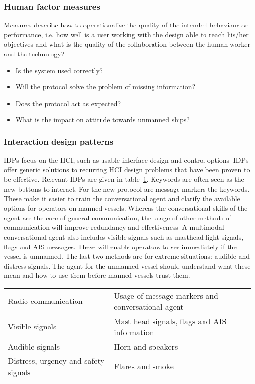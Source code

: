 \subsubsection{Human factor measures}
Measures describe how to operationalise the quality of the intended behaviour or performance, i.e. how well is a user working with the design able to reach his/her objectives and what is the quality of the collaboration between the human worker and the technology?
\begin{multicols}{2}
\begin{itemize}
	\item Is the system used correctly?
	\item Will the protocol solve the problem of missing information?
	\item Does the protocol act as expected?
	\item What is the impact on attitude towards unmanned ships?
\end{itemize}
\end{multicols}

\subsubsection{Interaction design patterns}
\acf{IDPs} focus on the \acf{HCI}, such as usable interface design and control options. IDPs offer generic solutions to recurring HCI design problems that have been proven to be effective. Relevant IDPs are given in table~\ref{tab:IDPs}.
Keywords are often seen as the new buttons to interact. For the new protocol are message markers the keywords. These make it easier to train the conversational agent and clarify the available options for operators on manned vessels. Whereas the conversational skills of the agent are the core of general communication, the usage of other methods of communication will improve redundancy and effectiveness. 
A multimodal conversational agent also includes visible signals such as masthead light signals, flags and AIS messages. These will enable operators to see immediately if the vessel is unmanned.
The last two methods are for extreme situations: audible and distress signals. The agent for the unmanned vessel should understand what these mean and how to use them before manned vessels trust them.

\begin{table}[htbp]
	\centering
	\begin{tabular}{l|l}
		\toprule
		Radio communication & Usage of message markers and conversational agent \\
		Visible signals & Mast head signals, flags and \ac{AIS} information \\
		Audible signals & Horn and speakers \\
		Distress, urgency and safety signals & Flares and smoke \\
		\bottomrule
	\end{tabular}
	
	\label{tab:IDPs}
\end{table}

